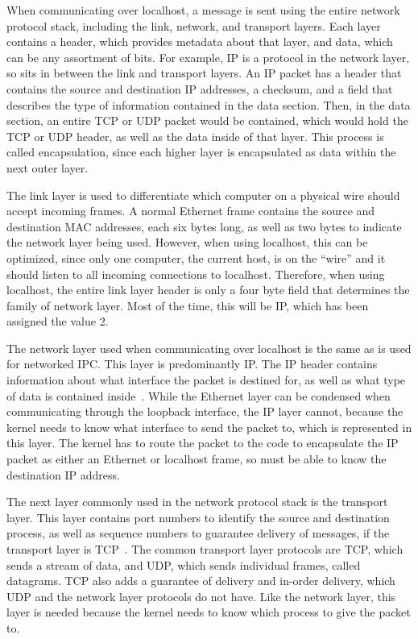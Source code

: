 When communicating over localhost, a message is sent using the entire network protocol stack, including the link, network, and transport layers.  Each layer contains a header, which provides metadata about that layer, and data, which can be any assortment of bits.  For example, IP is a protocol in the network layer, so sits in between the link and transport layers.  An IP packet has a header that contains the source and destination IP addresses, a checksum, and a field that describes the type of information contained in the data section.  Then, in the data section, an entire TCP or UDP packet would be contained, which would hold the TCP or UDP header, as well as the data inside of that layer.  This process is called encapsulation, since each higher layer is encapsulated as data within the next outer layer.

The link layer is used to differentiate which computer on a physical wire should accept incoming frames.  A normal Ethernet frame contains the source and destination MAC addresses, each six bytes long, as well as two bytes to indicate the network layer being used.  However, when using localhost, this can be optimized, since only one computer, the current host, is on the ``wire'' and it should listen to all incoming connections to localhost.  Therefore, when using localhost, the entire link layer header is only a four byte field that determines the family of network layer.  Most of the time, this will be IP, which has been assigned the value 2.

The network layer used when communicating over localhost is the same as is used for networked IPC.  This layer is predominantly IP.  The IP header contains information about what interface the packet is destined for, as well as what type of data is contained inside~\cite{RFC0791}.  While the Ethernet layer can be condensed when communicating through the loopback interface, the IP layer cannot, because the kernel needs to know what interface to send the packet to, which is represented in this layer.  The kernel has to route the packet to the code to encapsulate the IP packet as either an Ethernet or localhost frame, so must be able to know the destination IP address.

The next layer commonly used in the network protocol stack is the transport layer.  This layer contains port numbers to identify the source and destination process, as well as sequence numbers to guarantee delivery of messages, if the transport layer is TCP~\cite{RFC0793}.  The common transport layer protocols are TCP, which sends a stream of data, and UDP, which sends individual frames, called datagrams.  TCP also adds a guarantee of delivery and in-order delivery, which UDP and the network layer protocols do not have.  Like the network layer, this layer is needed because the kernel needs to know which process to give the packet to.

